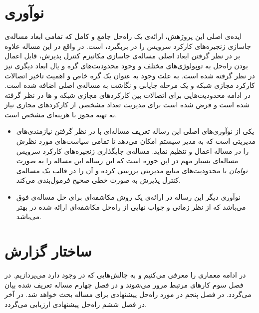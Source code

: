 \section{نوآوری}
ایده‌ی اصلی این پروژهش، ارائه‌ی یک راه‌حل جامع و کامل که تمامی ابعاد مساله‌ی جاسازی
زنجیره‌های کارکرد سرویس را در بربگیرد، است.
در واقع در این مساله علاوه بر در نظر گرفتن ابعاد اصلی مساله‌ی جاسازی مکانیزم کنترل پذیرش،
قابل اعمال بودن راه‌حل به توپولوژی‌های مختلف و وجود محدودیت‌های گره و یال ابعاد دیگری نیز در نظر گرفته شده است.
به علت وجود 
به عنوان یک گره خاص و اهمیت تاخیر اتصالات کارکرد مجازی شبکه و 
یک مرحله جایابی و نگاشت به مساله‌ی اصلی اضافه شده است.
در ادامه محدودیت‌هایی برای اتصالات بین کارکردهای مجازی شبکه و ها
در نظر گرفته شده است و فرض شده است برای مدیریت تعداد مشخصی از کارکردهای مجازی نیاز به تهیه
مجوز با هزینه‌ای مشخص است.

\begin{itemize}
    \item
    یکی از نوآوری‌های اصلی این رساله تعریف مساله‌ای با در نظر گرفتن نیازمندی‌های مدیریتی است
    که به مدیر سیستم امکان می‌دهد تا تمامی سیاست‌های مورد نظرش را در مساله اعمال و تنظیم نماید.
    مساله‌ی جایگذاری زنجیره‌های کارکرد سرویس مساله‌ای بسیار مهم در این حوزه است
    که این رساله این مساله را به صورت \emph{توامان} با محدودیت‌های منابع مدیریتی بررسی کرده و
    آن را در قالب یک مساله‌ی کنترل پذیرش به صورت خطی صحیح فرمول‌بندی می‌کند.
    \item
    نوآوری دیگر این رساله در ارائه‌ی یک روش مکاشفه‌ای برای حل مساله‌ی فوق می‌باشد
    که از نظر زمانی و جواب نهایی از راه‌حل مکاشفه‌ای ارائه شده در
    \cite{Bari2015}
    بهتر می‌باشد.
\end{itemize}

\section{ساختار گزارش}
در ادامه معماری 
را معرفی می‌کنیم
و به چالش‌هایی که در  وجود دارد می‌پردازیم.
در فصل سوم کارهای مرتبط مرور می‌شوند و در فصل چهارم مساله تعریف شده بیان می‌گردد. در فصل پنجم
در مورد راه‌حل پیشنهادی برای مساله بحث خواهد شد.
در آخر در فصل ششم راه‌حل پیشنهادی ارزیابی می‌گردد.
